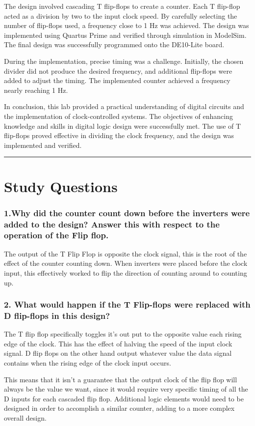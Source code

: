 \documentclass{article}
\begin{document}
The design involved cascading T flip-flops to create a counter. Each T flip-flop acted as a division by two to the input clock speed. By carefully selecting the number of flip-flops used, a frequency close to 1 Hz was achieved. The design was implemented using Quartus Prime and verified through simulation in ModelSim. The final design was successfully programmed onto the DE10-Lite board.

During the implementation, precise timing was a challenge. Initially, the chosen divider did not produce the desired frequency, and additional flip-flops were added to adjust the timing. The implemented counter achieved a frequency nearly reaching 1 Hz.

In conclusion, this lab provided a practical understanding of digital circuits and the implementation of clock-controlled systems. The objectives of enhancing knowledge and skills in digital logic design were successfully met. The use of T flip-flops proved effective in dividing the clock frequency, and the design was implemented and verified.
\vspace{5mm}
\hrule

\section*{\textcolor{mycolor}{Study Questions}}
\subsubsection*{\textcolor{mycolor}{1.Why did the counter count down before the inverters were added to the design? Answer this with respect to the operation of the Flip flop.}}
The output of the T Flip Flop is opposite the clock signal, this is the root of the effect of the counter counting down. When inverters were placed before the clock input, this effectively worked to flip the direction of counting around to counting up.
\subsubsection*{\textcolor{mycolor}{2. What would happen if the T Flip-flops were replaced with D flip-flops in this design?}}
The T flip flop specifically toggles it's out put to the opposite value each rising edge of the clock. This has the effect of halving the speed of the input clock signal. D flip flops on the other hand output whatever value the data signal contains when the rising edge of the clock input occurs.

This means that it isn't a guarantee that the output clock of the flip flop will always be the value we want, since it would require very specific timing of all the D inputs for each cascaded flip flop. Additional logic elements would need to be designed in order to accomplish a similar counter, adding to a more complex overall design.
\end{document}
